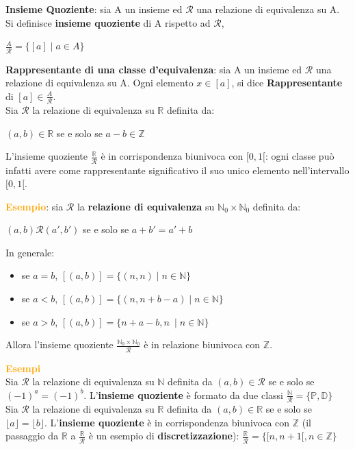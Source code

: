 \textbf{Insieme Quoziente}: sia A un insieme ed $\mathcal{R}$ una relazione di equivalenza su A. Si definisce \textbf{insieme quoziente} di A rispetto ad $\mathcal{R}$,
\begin{center}
    $\frac{A}{\mathcal{R}} = \{[a] \; | \; a \in A\}$
\end{center}
\textbf{Rappresentante di una classe d'equivalenza}: sia A un insieme ed $\mathcal{R}$ una relazione di equivalenza su A. Ogni elemento $x \in [a]$, si dice \textbf{Rappresentante} di $[a] \in \frac{A}{\mathcal{R}}$. \\
Sia $\mathcal{R}$ la relazione di equivalenza su $\mathbb{R}$ definita da:
\begin{center}
    $(a, b) \in \mathbb{R}$ se e solo se $a - b \in \mathbb{Z}$
\end{center}
L'insieme quoziente $\frac{\mathbb{R}}{\mathcal{R}}$ è in corrispondenza biunivoca con $[0, 1[$: ogni classe può infatti avere come rappresentante significativo il suo unico elemento nell'intervallo $[0, 1[$.

\begin{boxA}
    \textcolor{orange}{\textbf{Esempio}}: sia $\mathcal{R}$ la \textbf{relazione di equivalenza} su $\mathbb{N}_0 \times \mathbb{N}_0$ definita da:
    \begin{center}
        $(a,b)\mathcal{R}(a',b')$ se e solo se $a+b' = a'+b$
    \end{center}
    In generale:
    \begin{itemize}[nosep]
        \item se $a=b$, $[(a,b)] = \{(n,n) \; | \; n \in \mathbb{N}\}$
        \item se $a<b$, $[(a,b)] = \{(n,n+b-a) \; | \; n \in \mathbb{N}\}$
        \item se $a>b$, $[(a,b)] = \{n+a-b,n\ \; | \; n \in \mathbb{N}\}$
    \end{itemize}
    Allora l'insieme quoziente $\frac{\mathbb{N}_0 \times \mathbb{N}_0}{\mathcal{R}}$ è in relazione biunivoca con $\mathbb{Z}$.
\end{boxA}

\begin{boxA}
    \textcolor{orange}{\textbf{Esempi}} \\
    Sia $\mathcal{R}$ la relazione di equivalenza su $\mathbb{N}$ definita da $(a, b) \in \mathcal{R}$ se e solo se $(-1)^a = (-1)^b$. L'\textbf{insieme quoziente} è formato da due classi $\frac{\mathbb{N}}{\mathcal{R}} = \{\mathbb{P}, \mathbb{D}\}$ \\ \newline
    Sia $\mathcal{R}$ la relazione di equivalenza su $\mathbb{R}$ definita da $(a, b) \in \mathbb{R}$ se e solo se $\lfloor a \rfloor = \lfloor b \rfloor$. L'\textbf{insieme quoziente} è in corrispondenza biunivoca con $\mathbb{Z}$ (il passaggio da $\mathbb{R}$ a $\frac{\mathbb{R}}{\mathcal{R}}$ è un esempio di \textbf{discretizzazione}): $\frac{\mathbb{R}}{\mathcal{R}} = \{ [ n, n+1[, n \in \mathbb{Z} \}$
\end{boxA}

